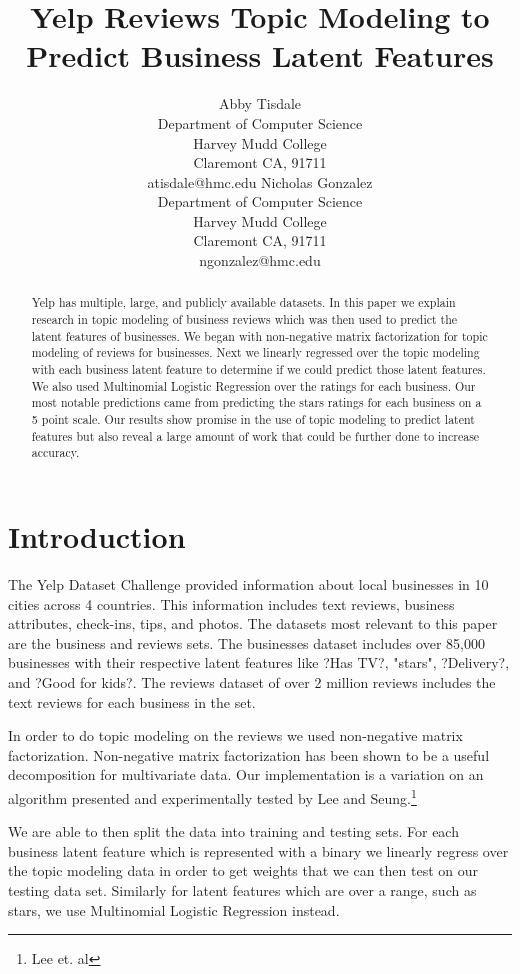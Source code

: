 \documentclass{article}
\title{Yelp Reviews Topic Modeling to Predict Business Latent Features}
\author{Abby Tisdale \\ Department of Computer Science \\ Harvey Mudd College \\Claremont CA, 91711 \\ atisdale@hmc.edu \And Nicholas Gonzalez \\ Department of Computer Science \\ Harvey Mudd College \\Claremont CA, 91711 \\ ngonzalez@hmc.edu}
\begin{document}
\maketitle

\begin{abstract}
  Yelp has multiple, large, and publicly available datasets.  In this paper we explain research in topic modeling of business reviews which was then used to predict the latent features of businesses.  We began with non-negative matrix factorization for topic modeling of reviews for businesses.  Next we linearly regressed over the topic modeling with each business latent feature to determine if we could predict those latent features.  We also used Multinomial Logistic Regression over the ratings for each business.  Our most notable predictions came from predicting the stars ratings for each business on a 5 point scale.  Our results show promise in the use of topic modeling to predict latent features but also reveal a large amount of work that could be further done to increase accuracy.
\end{abstract}

\section{Introduction}


The Yelp Dataset Challenge provided information about local businesses in 10 cities across 4 countries.  This information includes text reviews, business attributes, check-ins, tips, and photos.  The datasets most relevant to this paper are the business and reviews sets.  The businesses dataset includes over 85,000 businesses with their respective latent features like ?Has TV?, "stars", ?Delivery?, and ?Good for kids?.  The reviews dataset of over 2 million reviews includes the text reviews for each business in the set. 


In order to do topic modeling on the reviews we used non-negative matrix factorization.  Non-negative matrix factorization has been shown to be a useful decomposition for multivariate data.  Our implementation is a variation on an algorithm presented and experimentally tested by Lee and Seung.\footnote{Lee et. al}


We are able to then split the data into training and testing sets.  For each business latent feature which is represented with a binary we linearly regress over the topic modeling data in order to get weights that we can then test on our testing data set.  Similarly for latent features which are over a range, such as stars, we use Multinomial Logistic Regression instead.
\end{document}
